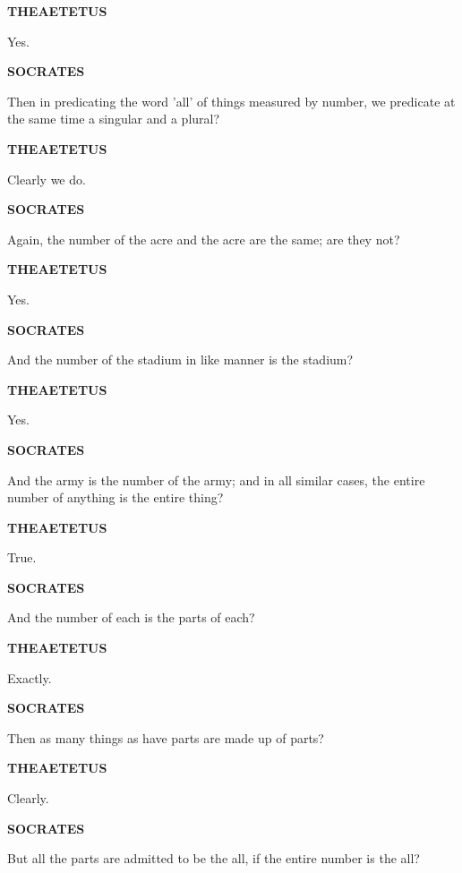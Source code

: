 \documentclass[11pt,letter]{article}
\begin{document}
\par \textbf{THEAETETUS}
\par   Yes.

\par \textbf{SOCRATES}
\par   Then in predicating the word 'all' of things measured by number, we predicate at the same time a singular and a plural?

\par \textbf{THEAETETUS}
\par   Clearly we do.

\par \textbf{SOCRATES}
\par   Again, the number of the acre and the acre are the same; are they not?

\par \textbf{THEAETETUS}
\par   Yes.

\par \textbf{SOCRATES}
\par   And the number of the stadium in like manner is the stadium?

\par \textbf{THEAETETUS}
\par   Yes.

\par \textbf{SOCRATES}
\par   And the army is the number of the army; and in all similar cases, the entire number of anything is the entire thing?

\par \textbf{THEAETETUS}
\par   True.

\par \textbf{SOCRATES}
\par   And the number of each is the parts of each?

\par \textbf{THEAETETUS}
\par   Exactly.

\par \textbf{SOCRATES}
\par   Then as many things as have parts are made up of parts?

\par \textbf{THEAETETUS}
\par   Clearly.

\par \textbf{SOCRATES}
\par   But all the parts are admitted to be the all, if the entire number is the all?
\end{document}
